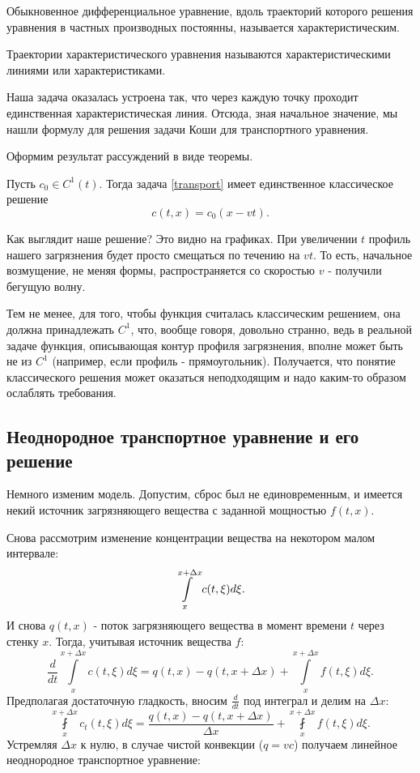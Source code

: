 \begin{definition} Обыкновенное дифференциальное уравнение, вдоль траекторий которого решения уравнения в частных производных постоянны, называется характеристическим.
\end{definition}

\begin{definition} Траектории характеристического уравнения называются характеристическими линиями или характеристиками.
\end{definition}

Наша задача оказалась устроена так, что через каждую точку проходит единственная характеристическая линия. Отсюда, зная начальное значение, мы нашли формулу для решения задачи Коши для транспортного уравнения.

Оформим результат рассуждений в виде теоремы.

\begin{theorem}
Пусть $c_0 \in C^1(t)$. Тогда задача \eqref{transport} имеет единственное классическое решение $$ c (t,x) = c_0 (x - v t) .$$
\end{theorem}


%

Как выглядит наше решение? Это видно на графиках. При увеличении $t$ профиль нашего загрязнения будет просто смещаться по течению на $vt$. То есть, начальное возмущение, не меняя формы, распространяется со скоростью $v$ - получили бегущую волну.

Тем не менее, для того, чтобы функция считалась классическим решением, она должна принадлежать $C^1$, что, вообще говоря, довольно странно, ведь в реальной задаче функция, описывающая контур профиля загрязнения, вполне может быть не из $C^1$ (например, если профиль - прямоугольник). Получается, что понятие классического решения может оказаться неподходящим и надо каким-то образом ослаблять требования.

\subsection{Неоднородное транспортное уравнение и его решение}

Немного изменим модель. Допустим, сброс был не единовременным, и имеется некий источник загрязняющего вещества с заданной мощностью $f(t,x)$. %

Снова рассмотрим изменение концентрации вещества на некотором малом интервале:
$$ \displaystyle \int \limits_x^{x + \Delta x} c (t, \xi) d \xi .$$
И снова $ q (t, x) $ - поток загрязняющего вещества в момент времени $t$ через стенку $x$. Тогда, учитывая источник вещества $f$:
$$ \frac{d}{dt} \int \limits_x^{x + \Delta x} c(t, \xi ) d \xi = q(t, x) - q(t, x + \Delta x) + \int \limits_x^{x+\Delta x} f(t,\xi) d\xi. $$
Предполагая достаточную гладкость, вносим $ \displaystyle \frac {d} {dt} $ под интеграл и делим на $ \Delta x $:
$$ \fint \limits_x^{x + \Delta x} c_t (t, \xi) d \xi  = \frac {q  (t, x) - q (t, x + \Delta x)}  {\Delta x} + \fint \limits_x^{x+\Delta x} f(t,\xi) d\xi. $$
Устремляя $ \Delta x$ к нулю, в случае чистой конвекции ($ q = vc $) получаем линейное неоднородное транспортное уравнение:

